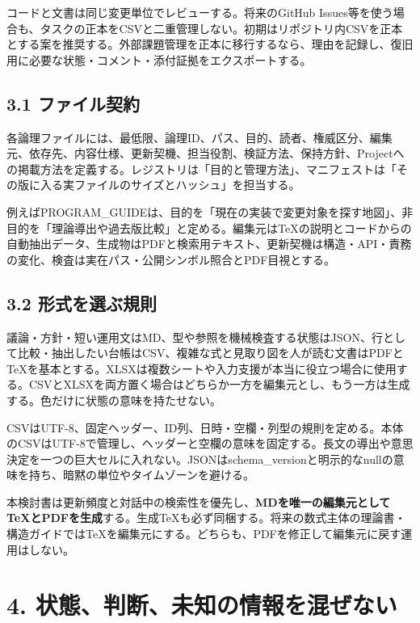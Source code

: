 \documentclass[11pt,a4paper]{article}
\begin{document}
コードと文書は同じ変更単位でレビューする。将来のGitHub
Issues等を使う場合も、タスクの正本をCSVと二重管理しない。初期はリポジトリ内CSVを正本とする案を推奨する。外部課題管理を正本に移行するなら、理由を記録し、復旧用に必要な状態・コメント・添付証拠をエクスポートする。

\subsection{3.1
ファイル契約}\label{ux30d5ux30a1ux30a4ux30ebux5951ux7d04}

各論理ファイルには、最低限、論理ID、パス、目的、読者、権威区分、編集元、依存先、内容仕様、更新契機、担当役割、検証方法、保持方針、Projectへの掲載方法を定義する。レジストリは「目的と管理方法」、マニフェストは「その版に入る実ファイルのサイズとハッシュ」を担当する。

例えばPROGRAM\_GUIDEは、目的を「現在の実装で変更対象を探す地図」、非目的を「理論導出や過去版比較」と定める。編集元はTeXの説明とコードからの自動抽出データ、生成物はPDFと検索用テキスト、更新契機は構造・API・責務の変化、検査は実在パス・公開シンボル照合とPDF目視とする。

\subsection{3.2
形式を選ぶ規則}\label{ux5f62ux5f0fux3092ux9078ux3076ux898fux5247}

議論・方針・短い運用文はMD、型や参照を機械検査する状態はJSON、行として比較・抽出したい台帳はCSV、複雑な式と見取り図を人が読む文書はPDFとTeXを基本とする。XLSXは複数シートや入力支援が本当に役立つ場合に使用する。CSVとXLSXを両方置く場合はどちらか一方を編集元とし、もう一方は生成する。色だけに状態の意味を持たせない。

CSVはUTF-8、固定ヘッダー、ID列、日時・空欄・列型の規則を定める。本体のCSVはUTF-8で管理し、ヘッダーと空欄の意味を固定する。長文の導出や意思決定を一つの巨大セルに入れない。JSONはschema\_versionと明示的なnullの意味を持ち、暗黙の単位やタイムゾーンを避ける。

本検討書は更新頻度と対話中の検索性を優先し、\textbf{MDを唯一の編集元としてTeXとPDFを生成}する。生成TeXも必ず同梱する。将来の数式主体の理論書・構造ガイドではTeXを編集元にする。どちらも、PDFを修正して編集元に戻す運用はしない。

\section{4.
状態、判断、未知の情報を混ぜない}\label{ux72b6ux614bux5224ux65adux672aux77e5ux306eux60c5ux5831ux3092ux6df7ux305cux306aux3044}
\end{document}
